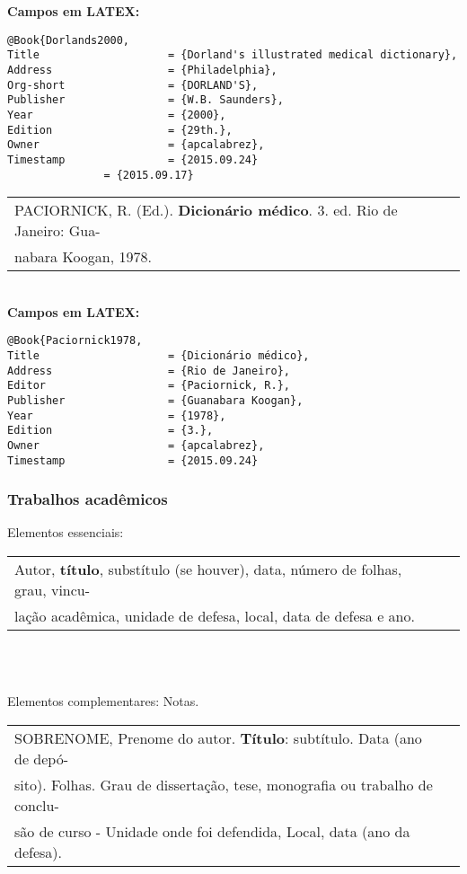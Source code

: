 \textbf{Campos em LATEX:}

\begin{verbatim}
@Book{Dorlands2000,
Title                    = {Dorland's illustrated medical dictionary},
Address                  = {Philadelphia},
Org-short                = {DORLAND'S},
Publisher                = {W.B. Saunders},
Year                     = {2000},
Edition                  = {29th.},
Owner                    = {apcalabrez},
Timestamp                = {2015.09.24}
               = {2015.09.17}
\end{verbatim}


\begin{tabular}{|l|c|} \hline
PACIORNICK, R. (Ed.). \textbf{Dicionário médico}. 3. ed. Rio de Janeiro: Gua-\\nabara Koogan,  1978.  \\\hline
\end{tabular}\\


\textbf{Campos em LATEX:}

\begin{verbatim}
@Book{Paciornick1978,
Title                    = {Dicionário médico},
Address                  = {Rio de Janeiro},
Editor                   = {Paciornick, R.},
Publisher                = {Guanabara Koogan},
Year                     = {1978},
Edition                  = {3.},
Owner                    = {apcalabrez},
Timestamp                = {2015.09.24}

\end{verbatim}
\subsubsection{Trabalhos acadêmicos}

Elementos essenciais: \\

\begin{tabular}{|l|c|} \hline
Autor, \textbf{título}, substítulo (se houver), data, número de folhas, grau, vincu-\\lação acadêmica, unidade de defesa, local, data de defesa e ano. \\\hline
\end{tabular}\\
\
 
Elementos complementares: Notas. \\

\begin{tabular}{|l|c|} \hline
SOBRENOME, Prenome do autor. \textbf{Título}: subtítulo. Data (ano de
depó-\\sito). Folhas. Grau de dissertação, tese, monografia ou
trabalho de conclu-\\são de curso - Unidade onde foi defendida,
Local, data (ano da defesa).\\\hline
\end{tabular}\\
\\

